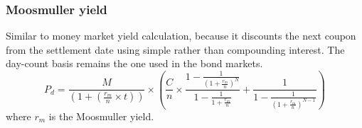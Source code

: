 \documentclass[8pt,a4paper]{article}
\begin{document}
\subsubsection{Moosmuller yield}
Similar to money market yield calculation, because it discounts the next coupon from the settlement date using simple rather than compounding interest. The day-count basis remains the one used in the bond markets.
\[
P_d=\frac{M}{(1+(\frac{r_m}{n}\times t))}\times (\frac{C}{n}\times \frac{1-\frac{1}{(1+\frac{r_m}{n})^N}}{1-\frac{1}{{1+\frac{r_m}{n}}}} + \frac{1}{1-\frac{1}{(1+\frac{r_m}{n})^{N-1}}})
\]
where $r_m$ is the Moosmuller yield.
\end{document}

